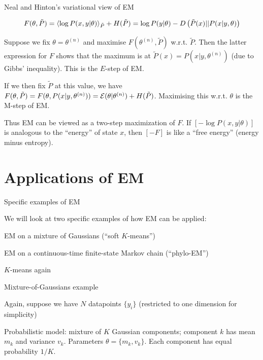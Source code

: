 \documentclass{beamer}
\begin{document}
\begin{frame}{Neal and Hinton's variational view of EM}

\[
F(\theta,\tilde{P}) = \langle \log P(x,y|\theta) \rangle_{\tilde{P}} + H(\tilde{P}) = \log P(y|\theta) - D \left( \tilde{P}(x)||P(x|y,\theta) \right)
\]

\itemb
  \item Suppose we fix $\theta=\theta^{(n)}$ and maximise $F(\theta^{(n)},\tilde{P})$ w.r.t. $\tilde{P}$.
Then the latter expression for $F$ shows that the maximum is at $\tilde{P}(x) = P(x|y,\theta^{(n)})$ (due to Gibbs' inequality).
This is the $E$-step of EM.
  \item If we then fix $\tilde{P}$ at this value, we have $F(\theta,\tilde{P})=F(\theta,P(x|y,\theta^{(n)})) = {\cal E}(\theta|\theta^{(n)}) + H(\tilde{P})$.
Maximising this w.r.t. $\theta$ is the M-step of EM.
  \item Thus EM can be viewed as a two-step maximization of $F$.
If $\left[-\log P(x,y|\theta)\right]$ is analogous to the ``energy'' of state $x$, then $[-F]$ is like a ``free energy'' (energy minus entropy).
 \iteme

\end{frame}


\section{Applications of EM}

\begin{frame}{Specific examples of EM}

We will look at two specific examples of how EM can be applied:
\itemb
\item EM on a mixture of Gaussians (``soft $K$-means'')
\item EM on a continuous-time finite-state Markov chain (``phylo-EM'')
\iteme

\end{frame}

\begin{frame}{$K$-means again}

Mixture-of-Gaussians example
 \itemb
 \item Again, suppose we have $N$ datapoints $\{y_i\}$ (restricted to one dimension for simplicity)
 \item Probabilistic model: mixture of $K$ Gaussian components; component $k$ has mean $m_k$ and variance $v_k$.
Parameters $\theta = \{ m_k, v_k \}$.
Each component has equal probability $1/K$.
\iteme

\end{frame}
\end{document}
